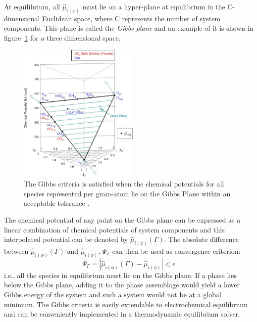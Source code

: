 	 At equilibrium, all $\hat{\mu}_{i(\phi)}$ must lie on a hyper-plane at equilibrium in the C-dimensional Euclidean space, where C represents the number of system components. This plane is called the \emph{Gibbs plane} and an example of it is shown in figure~\ref{fig:GibbsPlane} for a three dimensional space.
	 \begin{figure}[htbp]
		\centering
		\includegraphics[width=0.52\textwidth]{figures/Gibbs_plane.jpg}
		\caption{The Gibbs criteria is satisfied when the chemical potentials for all species represented per gram-atom lie on the Gibbs Plane within an acceptable tolerance \cite{Piro11a}.}
		\label{fig:GibbsPlane}
	\end{figure}

	The chemical potential of any point on the Gibbs plane can be expressed as a linear combination of  chemical potentials of system components and this interpolated potential can be denoted by $\hat{\mu}_{i(\phi)}(\Gamma)$. The absolute difference between $\hat{\mu}_{i(\phi)}(\Gamma)$ and $\hat{\mu}_{i(\phi)}$, $\Psi_{\Gamma}$ can then be used as convergence criterion:
		\begin{equation}\label{eqn:convGC}
			\Psi_{\Gamma} = \left \vert  \hat{\mu}_{i(\phi)}(\Gamma) - \hat{\mu}_{i(\phi)} \right \vert < \epsilon
		\end{equation}
	 i.e., all the species in equilibrium must lie on the Gibbs plane. If a phase lies below the Gibbs plane, adding it to the phase assemblage would yield a lower Gibbs energy of the system and such a system would not be at a global minimum. The Gibbs criteria is easily extendable to electrochemical equilibrium and can be conveniently implemented in a thermodynamic equilibrium	 solver.

